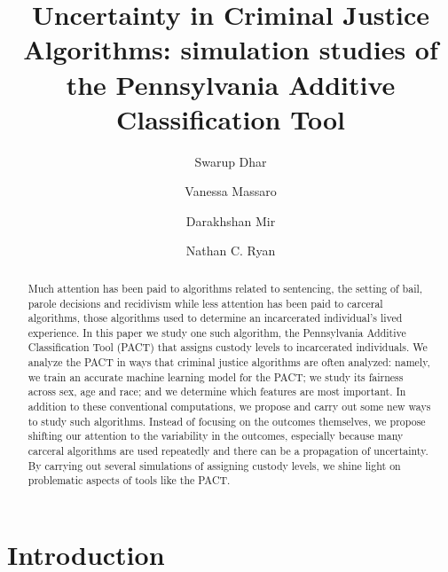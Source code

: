 \documentclass{amsproc}
\numberwithin{equation}{section}
\theoremstyle{plain}
\theoremstyle{remark}
\begin{document}
\title[Algorithmic Uncertainty]{Uncertainty in Criminal Justice Algorithms:  simulation studies of the Pennsylvania Additive Classification Tool}


\author[S. Dhar]{Swarup Dhar}
\address{Department of Mathematics, Bucknell University}
\author[V. Massaro]{Vanessa Massaro}
\address{Department of Geography, Bucknell University}
\author[D. Mir]{Darakhshan Mir}
\address{Department of Computer Science, Bucknell University}
\author[N.C. Ryan]{Nathan C. Ryan}
\address{Department of Mathematics, Bucknell University}




\maketitle

\begin{abstract}
Much attention has been paid to algorithms related to sentencing, the setting of bail, parole decisions and recidivism while less attention has been paid to carceral algorithms, those algorithms used to determine an incarcerated individual's lived experience.  In this paper we study one such algorithm, the Pennsylvania Additive Classification Tool (PACT) that assigns custody levels to incarcerated individuals.  We analyze the PACT in ways that criminal justice algorithms are often analyzed: namely, we train an accurate machine learning model for the PACT; we study its fairness across sex, age and race; and we determine which features are most important.  In addition to these conventional computations, we propose and carry out some new ways to study such algorithms.  Instead of focusing on the outcomes themselves, we propose shifting our attention to the variability in the outcomes, especially because many carceral algorithms are used repeatedly and there can be a propagation of uncertainty.  By carrying out several simulations of assigning custody levels, we shine light on problematic aspects of tools like the PACT.
\end{abstract}
 
\section{Introduction}
\end{document}
